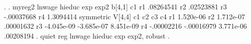 . 
. myreg2 lnwage hieduc exp exp2 
{\smallskip}
b[4,1]
            c1
r1   .08264541
r2   .02523881
r3  -.00037668
r4   1.3094414
{\smallskip}
symmetric V[4,4]
            c1          c2          c3          c4
r1   1.520e-06
r2   1.712e-07   .00001632
r3  -4.045e-09  -3.685e-07   8.451e-09
r4  -.00002216  -.00016979   3.771e-06   .00208194
{\smallskip}
. quiet reg lnwage hieduc exp exp2, robust
{\smallskip}
. 
